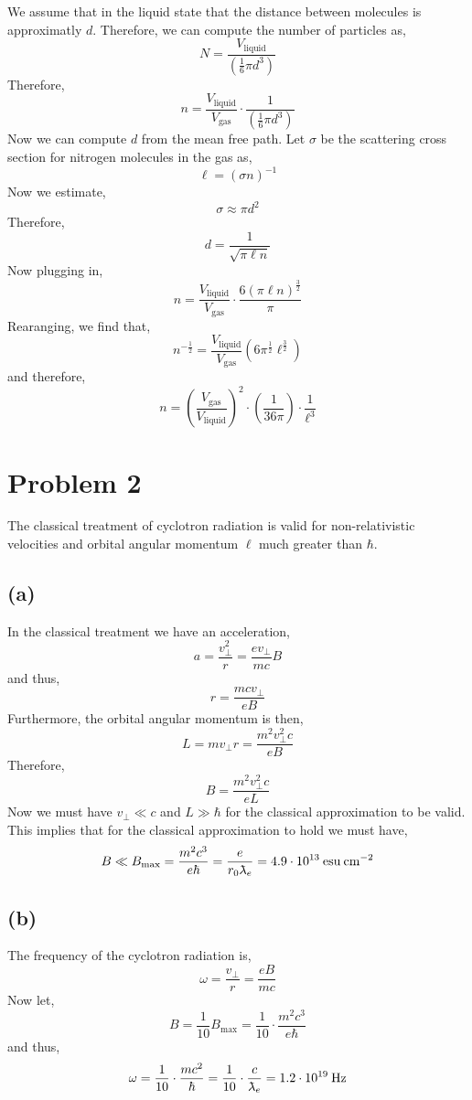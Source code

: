 \documentclass[12pt]{article}
\begin{document}
We assume that in the liquid state that the distance between molecules is approximatly $d$. Therefore, we can compute the number of particles as,
\[ N = \frac{V_{\text{liquid}}}{\left( \frac{1}{6} \pi d^3 \right)} \]
Therefore,
\[ n = \frac{V_{\text{liquid}}}{V_{\text{gas}}} \cdot \frac{1}{\left( \frac{1}{6} \pi d^3 \right)} \]
Now we can compute $d$ from the mean free path. Let $\sigma$ be the scattering cross section for nitrogen molecules in the gas as,
\[ \ell = (\sigma n)^{-1} \]
Now we estimate,
\[ \sigma \approx \pi d^2 \]
Therefore, 
\[ d = \frac{1}{\sqrt{\pi \ell n}} \]
Now plugging in,
\[ n = \frac{V_{\text{liquid}}}{V_{\text{gas}}} \cdot \frac{6 (\pi \ell n)^{\frac{3}{2}}}{\pi} \]
Rearanging, we find that,
\[ n^{-\frac{1}{2}} = \frac{V_{\text{liquid}}}{V_{\text{gas}}} (6 \pi^{\frac{1}{2}} \ell^{\frac{3}{2}})  \]
and therefore,
\[ n = \left( \frac{V_{\text{gas}}}{V_{\text{liquid}}} \right)^{2}  \cdot \left( \frac{1}{36 \pi} \right) \cdot \frac{1}{\ell^3} \]

\section{Problem 2}

The classical treatment of cyclotron radiation is valid for non-relativistic velocities and orbital angular momentum $\ell$ much greater than $\hbar$.


\subsection*{(a)}

In the classical treatment we have an acceleration,
\[ a = \frac{v_\perp^2}{r} = \frac{e v_\perp}{mc} B \] 
and thus,
\[ r = \frac{mc v_\perp}{e B} \]
Furthermore, the orbital angular momentum is then,
\[ L = m v_\perp r = \frac{m^2 v_\perp^2 c}{e B} \] 
Therefore,
\[ B = \frac{m^2 v_\perp^2 c}{e L} \]
Now we must have $v_\perp \ll c$ and $L \gg \hbar$ for the classical approximation to be valid. This implies that for the classical approximation to hold we must have,
\[ B \ll B_{\text{max}} = \frac{m^2 c^3}{e \hbar} = \frac{e}{r_0 \lambdabar_e} = 4.9 \cdot 10^{13} \: \text{esu} \: \text{cm}^{-2} \]

\subsection*{(b)}

The frequency of the cyclotron radiation is,
\[ \omega = \frac{v_\perp}{r} = \frac{e B}{mc} \]
Now let,
\[ B = \frac{1}{10} B_{\text{max}} = \frac{1}{10} \cdot \frac{m^2 c^3}{e \hbar} \]
and thus,
\[ \omega = \frac{1}{10} \cdot \frac{m c^2}{\hbar} = \frac{1}{10} \cdot \frac{c}{\lambdabar_e} = 1.2 \cdot 10^{19} \: \text{Hz} \]
\end{document}

